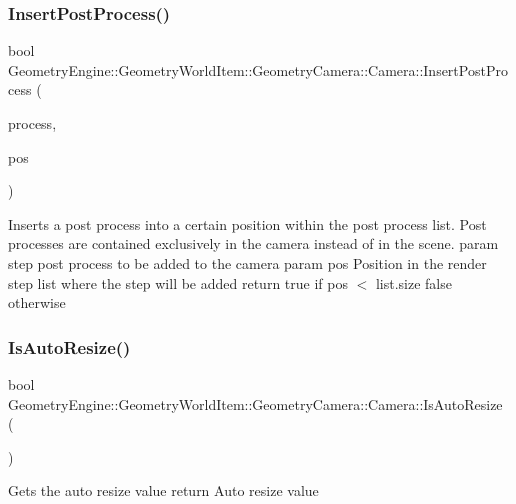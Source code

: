 \subsubsection{\texorpdfstring{InsertPostProcess()}{InsertPostProcess()}}
{\footnotesize\ttfamily bool Geometry\+Engine\+::\+Geometry\+World\+Item\+::\+Geometry\+Camera\+::\+Camera\+::\+Insert\+Post\+Process (\begin{DoxyParamCaption}\item[{const \mbox{\hyperlink{class_geometry_engine_1_1_geometry_post_process_1_1_post_process}{Geometry\+Post\+Process\+::\+Post\+Process}} \&}]{process,  }\item[{unsigned int}]{pos }\end{DoxyParamCaption})\hspace{0.3cm}{\ttfamily [virtual]}}

Inserts a post process into a certain position within the post process list. Post processes are contained exclusively in the camera instead of in the scene. param step post process to be added to the camera param pos Position in the render step list where the step will be added return true if pos $<$ list.\+size false otherwise \mbox{\label{class_geometry_engine_1_1_geometry_world_item_1_1_geometry_camera_1_1_camera_a48e1e7bfc2aea19d21ecf5a311815740}} 
\subsubsection{\texorpdfstring{IsAutoResize()}{IsAutoResize()}}
{\footnotesize\ttfamily bool Geometry\+Engine\+::\+Geometry\+World\+Item\+::\+Geometry\+Camera\+::\+Camera\+::\+Is\+Auto\+Resize (\begin{DoxyParamCaption}{ }\end{DoxyParamCaption})\hspace{0.3cm}{\ttfamily [inline]}}

Gets the auto resize value return Auto resize value \mbox{\label{class_geometry_engine_1_1_geometry_world_item_1_1_geometry_camera_1_1_camera_adb12d29b67837c4d5e5c94f6cb956bbd}} 
